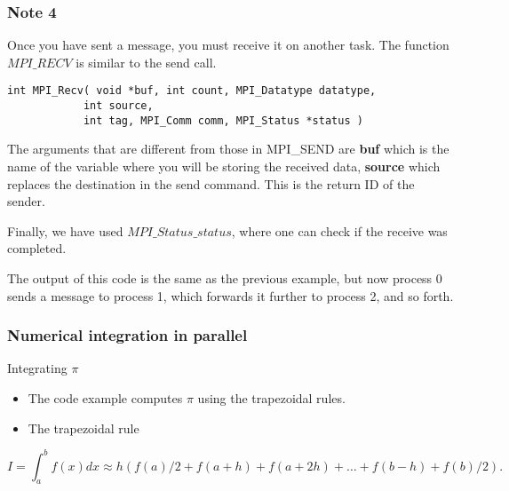 \documentclass{beamer}
\begin{document}
\begin{frame}
\frametitle{Note 4}

\begin{block}{}

Once you have  sent a message, you must receive it on another task. The function $MPI\_RECV$
is similar to the send call.
\begin{verbatim}
int MPI_Recv( void *buf, int count, MPI_Datatype datatype, 
            int source, 
            int tag, MPI_Comm comm, MPI_Status *status )
\end{verbatim}

The arguments that are different from those in MPI\_SEND are
\textbf{buf} which  is the name of the variable where you will  be storing the received data, 
\textbf{source} which  replaces the destination in the send command. This is the return ID of the sender.

Finally,  we have used  $MPI\_Status\_status$,  
where one can check if the receive was completed.

The output of this code is the same as the previous example, but now
process 0 sends a message to process 1, which forwards it further
to process 2, and so forth.


\end{block}
\end{frame}

\begin{frame}
\frametitle{Numerical integration in parallel}

\begin{block}{Integrating $\pi$ }

\begin{itemize}
\item The code example computes $\pi$ using the trapezoidal rules.

\item The trapezoidal rule
\end{itemize}

\noindent
\[
   I=\int_a^bf(x) dx\approx h\left(f(a)/2 + f(a+h) +f(a+2h)+\dots +f(b-h)+ f(b)/2\right).
\]


\end{block}
\end{frame}
\end{document}
